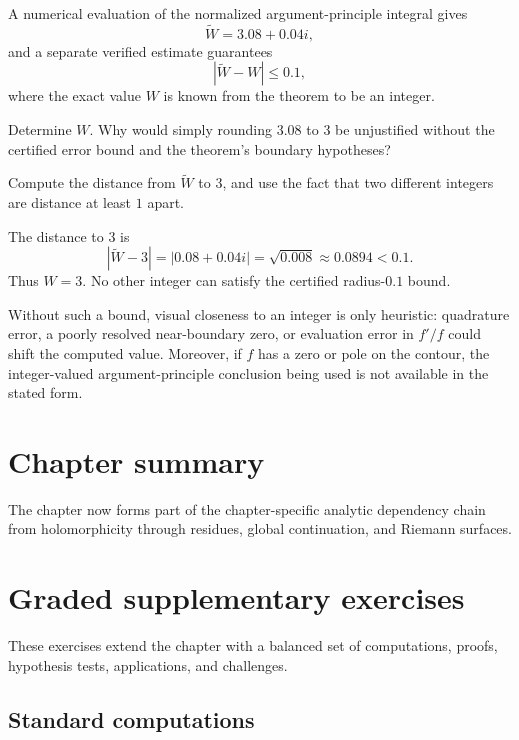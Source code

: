 \begin{exercise}\label{exr:iv12-numerical-count-01}
A numerical evaluation of the normalized argument-principle integral gives
\[
\widetilde W=3.08+0.04i,
\]
and a separate verified estimate guarantees
\[
|\widetilde W-W|\le0.1,
\]
where the exact value \(W\) is known from the theorem to be an integer.

Determine \(W\).  Why would simply rounding \(3.08\) to \(3\) be unjustified
without the certified error bound and the theorem's boundary hypotheses?
\end{exercise}
\begin{hint}
Compute the distance from \(\widetilde W\) to \(3\), and use the fact that two
different integers are distance at least \(1\) apart.
\end{hint}
\begin{solution}
The distance to \(3\) is
\[
|\widetilde W-3|
=
|0.08+0.04i|
=
\sqrt{0.008}
\approx0.0894<0.1.
\]
Thus \(W=3\).  No other integer can satisfy the certified radius-\(0.1\) bound.

Without such a bound, visual closeness to an integer is only heuristic:
quadrature error, a poorly resolved near-boundary zero, or evaluation error in
\(f'/f\) could shift the computed value.  Moreover, if \(f\) has a zero or pole
on the contour, the integer-valued argument-principle conclusion being used is
not available in the stated form.
\end{solution}

\section*{Chapter summary}
The chapter now forms part of the chapter-specific analytic dependency chain from holomorphicity through residues, global continuation, and Riemann surfaces.
\section{Graded supplementary exercises}
These exercises extend the chapter with a balanced set of computations, proofs, hypothesis tests, applications, and challenges.

\subsection*{Standard computations}

